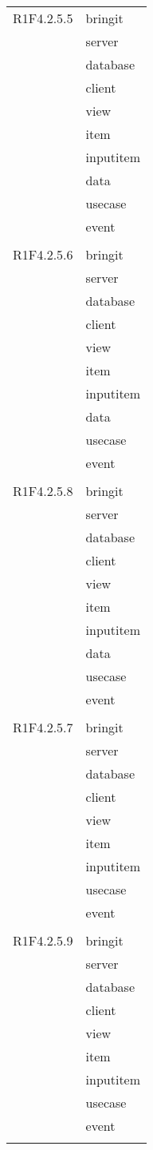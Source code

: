 \begin{center}
\begin{longtable}{|p{7cm}|p{7cm}|}
		R1F4.2.5.5 & bringit \\ & server \\ & database \\ & client \\ & view \\ & item \\ & inputitem \\ & data \\ & usecase \\ & event \\ & \\ \hline
		R1F4.2.5.6 & bringit \\ & server \\ & database \\ & client \\ & view \\ & item \\ & inputitem \\ & data \\ & usecase \\ & event \\ & \\ \hline
		R1F4.2.5.8 & bringit \\ & server \\ & database \\ & client \\ & view \\ & item \\ & inputitem \\ & data \\ & usecase \\ & event \\ & \\ \hline
		R1F4.2.5.7 & bringit \\ & server \\ & database \\ & client \\ & view \\ & item \\ & inputitem \\ & usecase \\ & event \\ & \\ \hline
		R1F4.2.5.9 & bringit \\ & server \\ & database \\ & client \\ & view \\ & item \\ & inputitem \\ & usecase \\ & event \\ & \\ \hline

\end{longtable}
\end{center}
